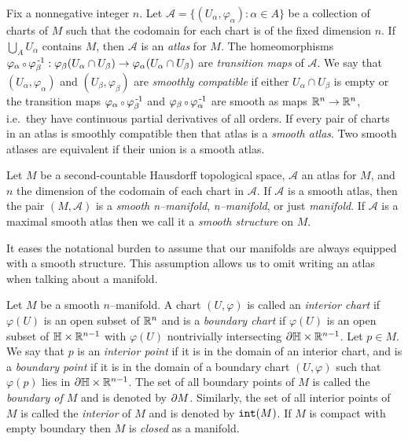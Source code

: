 \begin{defn}[Atlas]
	\label{def:atlas}
	Fix a nonnegative integer $n$.
	Let $\mathcal{A}=\{(U_\alpha,\varphi_\alpha):\alpha\in A\}$ be a collection of charts of $M$ such that the codomain for each chart is of the fixed dimension $n$.
	If $\bigcup_A U_\alpha$ contains $M$, then $\mathcal{A}$ is an \emph{atlas} for $M$.
	The homeomorphisms $\varphi_\alpha\comp \varphi_\beta\inv:\varphi_\beta(U_\alpha\cap U_\beta)\to \varphi_\alpha(U_\alpha\cap U_\beta)$ are \emph{transition maps} of $\mathcal{A}$.
	We say that $(U_\alpha,\varphi_\alpha)$ and $(U_\beta,\varphi_\beta)$ are \emph{smoothly compatible} if either $U_\alpha\cap U_\beta$ is empty or the transition maps $\varphi_\alpha\comp \varphi_\beta\inv$ and $\varphi_\beta\comp \varphi_\alpha\inv$ are smooth as maps $\mathbb{R}^n\to\mathbb{R}^n$, i.e.\ they have continuous partial derivatives of all orders.
	If every pair of charts in an atlas is smoothly compatible then that atlas is a \emph{smooth atlas}.
	Two smooth atlases are equivalent if their union is a smooth atlas.
\end{defn}

\begin{defn}[Manifold]
	\label{def:manifold}
	Let $M$ be a second-countable Hausdorff topological space, $\mathcal{A}$ an atlas for $M$, and $n$ the dimension of the codomain of each chart in $\mathcal{A}$.
	If $\mathcal{A}$ is a smooth atlas, then the pair $(M,\mathcal{A})$ is a \emph{smooth n--manifold},  \emph{n--manifold}, or just \emph{manifold}.
	If $\mathcal{A}$ is a maximal smooth atlas then we call it a \emph{smooth structure} on $M$.
\end{defn}

It eases the notational burden to assume that our manifolds are always equipped with a smooth structure.
This assumption allows us to omit writing an atlas when talking about a manifold.
	
\begin{defn}[Boundary]
	Let $M$ be a smooth $n$--manifold.
	A chart $(U,\varphi)$ is called an \emph{interior chart} if $\varphi(U)$ is an open subset of $\mathbb{R}^n$ and is a \emph{boundary chart} if $\varphi(U)$ is an open subset of $\mathbb{H}\times\mathbb{R}^{n-1}$ with $\varphi(U)$ nontrivially intersecting $\partial \mathbb{H}\times\mathbb{R}^{n-1}$.
	Let $p\in M$.
	We say that $p$ is an \emph{interior point} if it is in the domain of an interior chart, and is a \emph{boundary point} if it is in the domain of a boundary chart $(U,\varphi)$ such that $\varphi(p)$ lies in $\partial\mathbb{H}\times\mathbb{R}^{n-1}$.
	The set of all boundary points of $M$ is called the \emph{boundary of $M$} and is denoted by $\partial M$.
	Similarly, the set of all interior points of $M$ is called the \emph{interior} of $M$ and is denoted by $\mathtt{int}(M)$.
	If $M$ is compact with empty boundary then $M$ is \emph{closed} as a manifold.
\end{defn}

